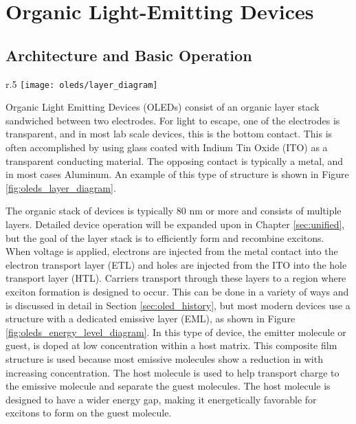 \documentclass[../thesis.tex]{subfiles}
\begin{document}
\chapter{Organic Light-Emitting Devices}\label{sec:oleds}

\section{Architecture and Basic Operation} \label{sec:oled_operation}

\begin{wrapfigure}{r}{.5\textwidth}
\centering
\texttt{[image: oleds/layer\_diagram]}
\caption{Basic layer diagram for OLED devices.}
\label{fig:oleds_layer_diagram}
\end{wrapfigure}

Organic Light Emitting Devices (OLEDs) consist of an organic layer stack sandwiched between two electrodes.
For light to escape, one of the electrodes is transparent, and in most lab scale devices, this is the bottom contact.
This is often accomplished by using glass coated with Indium Tin Oxide (ITO) as a transparent conducting material.
The opposing contact is typically a metal, and in most cases Aluminum.
An example of this type of structure is shown in Figure \ref{fig:oleds_layer_diagram}.

The organic stack of devices is typically 80 nm or more and consists of multiple layers.
Detailed device operation will be expanded upon in Chapter \ref{sec:unified}, but the goal of the layer stack is to efficiently form and recombine excitons.
When voltage is applied, electrons are injected from the metal contact into the electron transport layer (ETL) and holes are injected from the ITO into the hole transport layer (HTL).
Carriers transport through these layers to a region where exciton formation is designed to occur.  
This can be done in a variety of ways and is discussed in detail in Section \ref{sec:oled_history}, but most modern devices use a structure with a dedicated emissive layer (EML), as shown in Figure \ref{fig:oleds_energy_level_diagram}.
In this type of device, the emitter molecule or guest, is doped at low concentration within a host matrix.\supercite{Baldo2000}
This composite film structure is used because most emissive molecules show a reduction in \pl with increasing concentration.\supercite{Turro1991a}
The host molecule is used to help transport charge to the emissive molecule and separate the guest molecules.
The host molecule is designed to have a wider energy gap, making it energetically favorable for excitons to form on the guest molecule.
\end{document}
